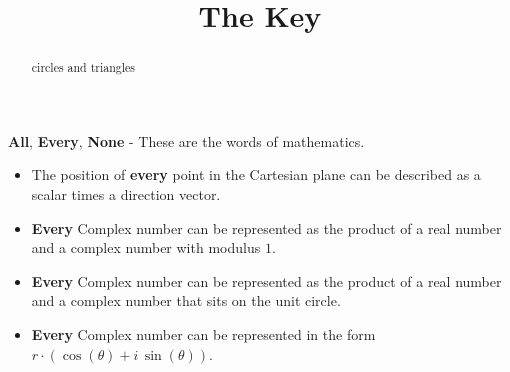 \documentclass{ximera}
\title{The Key}
\begin{document}
\begin{abstract}
circles and triangles
\end{abstract}
\maketitle





\textbf{\textcolor{red!70!black}{All}}, \textbf{\textcolor{red!80!black}{Every}}, \textbf{\textcolor{red!80!black}{None}} - These are the words of mathematics. 



\begin{itemize}
\item The position of \textbf{\textcolor{red!70!black}{every}} point in the Cartesian plane can be described as a scalar times a direction vector.  

\item \textbf{\textcolor{red!70!black}{Every}} Complex number can be represented as the product of a real number and a complex number with modulus $1$.

\item \textbf{\textcolor{red!70!black}{Every}} Complex number can be represented as the product of a real number and a complex number that sits on the unit circle.

\item \textbf{\textcolor{red!70!black}{Every}} Complex number can be represented in the form \textbf{\textcolor{purple!85!blue}{$r \cdot (\cos(\theta) + i \, \sin(\theta))$}}.
\end{itemize}
\end{document}
